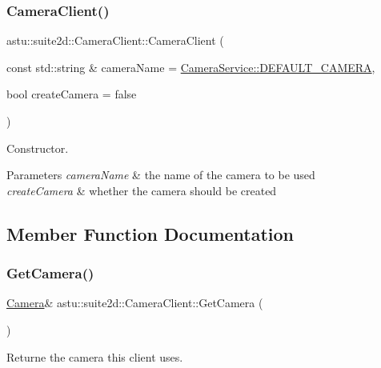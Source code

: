 \subsubsection{\texorpdfstring{Camera\+Client()}{CameraClient()}}
{\footnotesize\ttfamily astu\+::suite2d\+::\+Camera\+Client\+::\+Camera\+Client (\begin{DoxyParamCaption}\item[{const std\+::string \&}]{camera\+Name = {\ttfamily \hyperlink{classastu_1_1suite2d_1_1CameraService_ae92f5163a54b2ab8dd738cadee8f75eb}{Camera\+Service\+::\+D\+E\+F\+A\+U\+L\+T\+\_\+\+C\+A\+M\+E\+RA}},  }\item[{bool}]{create\+Camera = {\ttfamily false} }\end{DoxyParamCaption})}

Constructor.


\begin{DoxyParams}{Parameters}
{\em camera\+Name} & the name of the camera to be used \\
\hline
{\em create\+Camera} & whether the camera should be created \\
\hline
\end{DoxyParams}


\subsection{Member Function Documentation}
\mbox{\label{classastu_1_1suite2d_1_1CameraClient_ac305ddbdf19d60d260a0d8af57d8a1d0}} 
\subsubsection{\texorpdfstring{Get\+Camera()}{GetCamera()}\hspace{0.1cm}{\footnotesize\ttfamily [1/2]}}
{\footnotesize\ttfamily \hyperlink{classastu_1_1suite2d_1_1Camera}{Camera}\& astu\+::suite2d\+::\+Camera\+Client\+::\+Get\+Camera (\begin{DoxyParamCaption}{ }\end{DoxyParamCaption})\hspace{0.3cm}{\ttfamily [inline]}}

Returne the camera this client uses.

